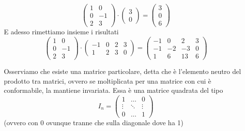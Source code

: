 \documentclass{article}     %
\begin{document}
\begin{ex}
    \[\begin{pmatrix} 1&0\\0&- 1\\2&3 \end{pmatrix} \cdot \begin{pmatrix} 3\\0\end{pmatrix} = \begin{pmatrix} 3\\0\\6 \end{pmatrix}\]
    E adesso rimettiamo insieme i risultati
    \[\begin{pmatrix} 1&0\\0&- 1\\2&3 \end{pmatrix} \cdot \begin{pmatrix} - 1&0&2&3\\1&2&3&0 \end{pmatrix} = \begin{pmatrix} - 1&0&2&3\\- 1&- 2&- 3&0\\1&6&13&6 \end{pmatrix} \]
\end{ex}
Osserviamo che esiste una matrice particolare, detta  che è l'elemento neutro del prodotto tra matrici, ovvero se moltiplicata per una matrice con cui è conformabile, la mantiene invariata. Essa è una matrice quadrata del tipo
\[I_n=\begin{pmatrix}1&\dots&0\\ \vdots&\ddots&\vdots \\ 0&\dots&1\end{pmatrix}\]
(ovvero con 0 ovunque tranne che sulla diagonale dove ha 1)
\end{document}
